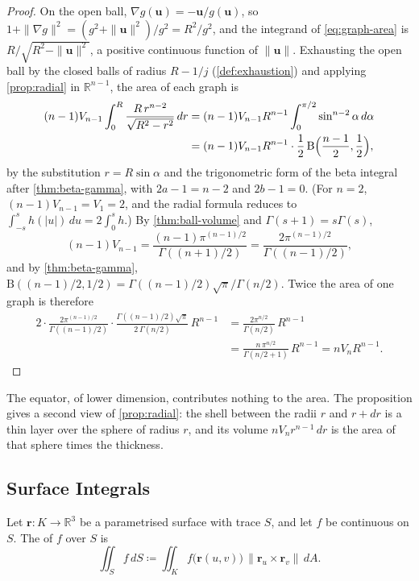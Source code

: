 \begin{proof}
On the open ball, $\nabla g(\mathbf u)=-\mathbf u/g(\mathbf u)$, so $1+\|\nabla g\|^2=(g^2+\|\mathbf u\|^2)/g^2=R^2/g^2$, and the integrand of \eqref{eq:graph-area} is $R/\sqrt{R^2-\|\mathbf u\|^2}$, a positive continuous function of $\|\mathbf u\|$. Exhausting the open ball by the closed balls of radius $R-1/j$ (\cref{def:exhaustion}) and applying \cref{prop:radial} in $\mathbb R^{n-1}$, the area of each graph is
\[
\begin{aligned}
(n-1)V_{n-1}\int_0^R\frac{R\,r^{n-2}}{\sqrt{R^2-r^2}}\,dr&=(n-1)V_{n-1}R^{n-1}\int_0^{\pi/2}\sin^{n-2}\alpha\,d\alpha\\
&=(n-1)V_{n-1}R^{n-1}\cdot\frac12\,\mathrm B\Bigl(\frac{n-1}2,\frac12\Bigr),
\end{aligned}
\]
by the substitution $r=R\sin\alpha$ and the trigonometric form of the beta integral after \cref{thm:beta-gamma}, with $2a-1=n-2$ and $2b-1=0$. (For $n=2$, $(n-1)V_{n-1}=V_1=2$, and the radial formula reduces to $\int_{-s}^sh(|u|)\,du=2\int_0^sh$.) By \cref{thm:ball-volume} and $\Gamma(s+1)=s\Gamma(s)$,
\[
(n-1)V_{n-1}=\frac{(n-1)\pi^{(n-1)/2}}{\Gamma((n+1)/2)}=\frac{2\pi^{(n-1)/2}}{\Gamma((n-1)/2)},
\]
and by \cref{thm:beta-gamma}, $\mathrm B((n-1)/2,1/2)=\Gamma((n-1)/2)\sqrt\pi/\Gamma(n/2)$. Twice the area of one graph is therefore
\[
\begin{aligned}
2\cdot\frac{2\pi^{(n-1)/2}}{\Gamma((n-1)/2)}\cdot\frac{\Gamma((n-1)/2)\sqrt\pi}{2\,\Gamma(n/2)}\,R^{n-1}&=\frac{2\pi^{n/2}}{\Gamma(n/2)}\,R^{n-1}\\
&=\frac{n\,\pi^{n/2}}{\Gamma(n/2+1)}\,R^{n-1}=nV_nR^{n-1}.
\end{aligned}
\]
\end{proof}

The equator, of lower dimension, contributes nothing to the area. The proposition gives a second view of \cref{prop:radial}: the shell between the radii $r$ and $r+dr$ is a thin layer over the sphere of radius $r$, and its volume $nV_nr^{n-1}\,dr$ is the area of that sphere times the thickness.

\subsection{Surface Integrals}

\begin{definition}
\label{def:surface-integral}
Let $\mathbf r\colon K\to\mathbb R^3$ be a parametrised surface with trace $S$, and let $f$ be continuous on $S$. The  of $f$ over $S$ is
\[
\iint_Sf\,dS\coloneqq\iint_Kf\bigl(\mathbf r(u,v)\bigr)\,\|\mathbf r_u\times\mathbf r_v\|\,dA .
\]
\end{definition}

